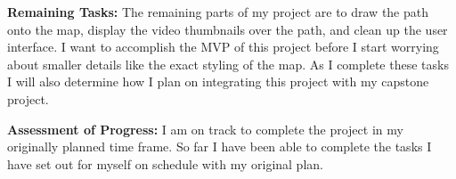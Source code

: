\documentclass{article}
\begin{document}
\textbf{Remaining Tasks:} The remaining parts of my project are to draw the path onto the map, display the video thumbnails over the path,
and clean up the user interface. I want to accomplish the MVP of this project before I start worrying about smaller details like the 
exact styling of the map. As I complete these tasks I will also determine how I plan on integrating this project with 
my capstone project.

\textbf{Assessment of Progress:} I am on track to complete the project in my originally planned time frame. So far I have been able to
complete the tasks I have set out for myself on schedule with my original plan.
\end{document}
